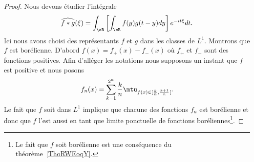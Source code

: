 \begin{proof}
	Nous devons étudier l'intégrale
	\begin{equation}
		\widehat{f*g}(\xi)=\int_{\eR}\left[ \int_{\eR} f(y)g(t-y)dy\right] e^{-it\xi} dt.
	\end{equation}
	Ici nous avons choisi des représentants \( f\) et \( g\) dans les classes de \( L^1\). Montrons que \( f\) est borélienne. D'abord \( f(x)=f_+(x)-f_-(x)\) où \( f_+\) et \( f_-\) sont des fonctions positives. Afin d'alléger les notations nous supposons un instant que \( f\) est positive et nous posons
	\begin{equation}
		f_n(x)=\sum_{k=1}^{2^n} \frac{ k }{ n }\mtu_{f(x)\in\mathopen[ \frac{ k }{ n } , \frac{ k+1 }{ n } [}.
	\end{equation}
	Le fait que \( f\) soit dans \( L^1\) implique que chacune des fonctions \( f_n\) est borélienne et donc que \( f\) l'est aussi en tant que limite ponctuelle de fonctions boréliennes\footnote{Le fait que \( f\) soit borélienne est une conséquence du théorème~\ref{ThoRWEoqY}.}.


\end{proof}
